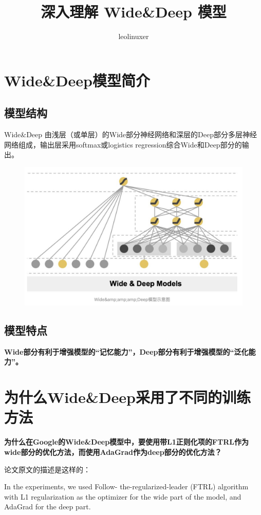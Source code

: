 \documentclass[12pt]{article}
\title{深入理解 Wide\&Deep 模型\cite{Understand_Wide_And_Deep_Model}}
\author{leolinuxer}
\begin{document}
\maketitle
\tableofcontents

\section{Wide\&Deep模型简介}
\subsection{模型结构}
Wide\&Deep 由浅层（或单层）的Wide部分神经网络和深层的Deep部分多层神经网络组成，输出层采用softmax或logistics regression综合Wide和Deep部分的输出。
\begin{figure}[H]
    \centering
    \includegraphics[width=1\textwidth]{fig/Wide_Deep_Structure.png}
\end{figure}

\subsection{模型特点}
\textbf{Wide部分有利于增强模型的“记忆能力”，Deep部分有利于增强模型的“泛化能力”。}

\section{为什么Wide\&Deep采用了不同的训练方法}

\begin{framed}
\textbf{为什么在Google的Wide\&Deep模型中，要使用带L1正则化项的FTRL作为wide部分的优化方法，而使用AdaGrad作为deep部分的优化方法？}

论文原文的描述是这样的：

In the experiments, we used Follow- the-regularized-leader (FTRL) algorithm with L1 regularization as the optimizer for the wide part of the model, and AdaGrad for the deep part.
\end{framed}
\end{document}
